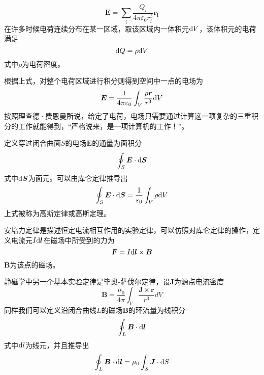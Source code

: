 \documentclass[UTF8,a4paper,10pt]{ctexart}
\begin{document}
\begin{multicols}{2}
        \begin{equation}
            \bm{E} = \sum_i\frac{Q_i}{4\pi\varepsilon_0r_i^3}\bm{r_i}
        \end{equation}
        在许多时候电荷连续分布在某一区域，取该区域内一体积元${\rm d}V$，该体积元的电荷满足
        \begin{equation*}
            {\rm d}Q = \rho{\rm d}V
        \end{equation*}
        式中$\rho$为电荷密度。\par
        根据上式，对整个电荷区域进行积分则得到空间中一点的电场为
        \begin{equation}
            \bm{E}=\frac{1}{4\pi\varepsilon_0}\int_V\frac{\rho\bm{r}}{r^3}{\rm d}V
        \end{equation}
        按照理查德·费恩曼所说，给定了电荷，电场只需要通过计算这一项复杂的三重积分的工作就能得到，“严格说来，是一项计算机的工作！”。\par
        定义穿过闭合曲面$S$的电场$\bm{E}$的通量为面积分
        \begin{equation*}
            \oint_S\bm{E}\cdot{\rm d}\bm{S}
        \end{equation*}
        式中${\rm d}\bm{S}$为面元。可以由库仑定律推导出
        \begin{equation}
            \oint_S\bm{E}\cdot{\rm d}\bm{S} = \frac{1}{\varepsilon_0}\int_V\rho{\rm d}V
        \end{equation}
        上式被称为高斯定律或高斯定理。\par
        安培力定律是描述恒定电流相互作用的实验定律，可以仿照对库仑定律的操作，定义电流元$I{\rm d}\bm{l}$在磁场中所受到的力为
        \begin{equation}
            \bm{F}=I{\rm d}\bm{l}\times\bm{B}
        \end{equation}
        $\bm{B}$为该点的磁场。\par
        静磁学中另一个基本实验定律是毕奥-萨伐尔定律，设$\bm{J}$为源点电流密度
        \begin{equation}
            \bm{B}=\frac{\mu_0}{4\pi}\int_V\frac{\bm{J}\times\bm{r}}{r^3}dV
        \end{equation}
        同样我们可以定义沿闭合曲线$L$的磁场$\bm{B}$的环流量为线积分
        \begin{equation*}
            \oint_L\bm{B}\cdot{\rm d}\bm{l}
        \end{equation*}
        式中${\rm d}l$为线元，并且推导出
        \begin{equation}
            \oint_L\bm{B}\cdot{\rm d}\bm{l} = \mu_0\int_S\bm{J}\cdot{\rm d}S

\end{equation}
\end{multicols}
\end{document}
